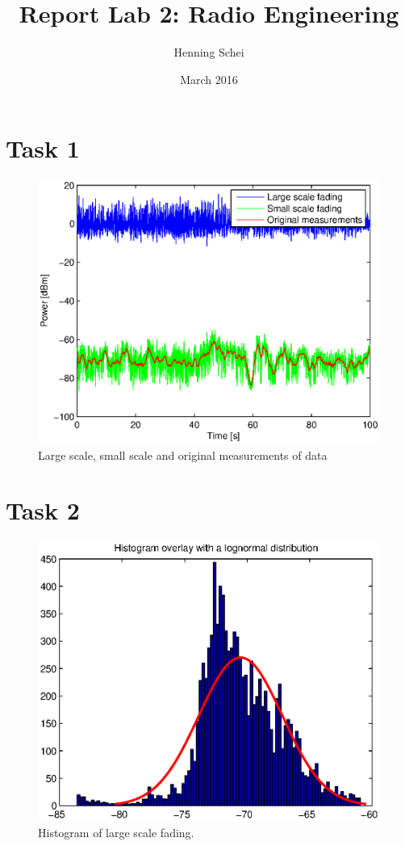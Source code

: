 \documentclass{article}
\title{Report Lab 2: Radio Engineering}
\author{Henning Schei}
\date{March 2016}
\begin{document}
\maketitle

\section{Task 1}
\begin{figure}[H]
    \centering
    \includegraphics[width=1.0\textwidth]{task1.eps}
    \caption{Large scale, small scale and original measurements of data}
    \label{fig:task1}
\end{figure}

\section{Task 2}

\begin{figure}[H]
    \centering
    \includegraphics[width=1.0\textwidth]{task2.eps}
    \caption{Histogram of large scale fading.}
    \label{fig:task2}
\end{figure}
\end{document}
